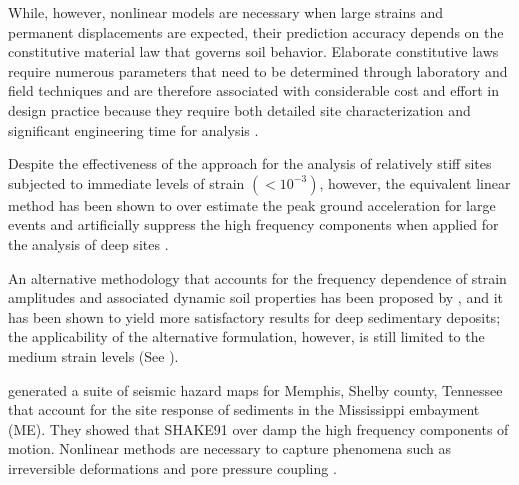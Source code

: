 While, however, nonlinear models are necessary when large strains and permanent displacements are expected, their prediction accuracy depends on the constitutive material law that governs soil behavior. Elaborate constitutive laws require numerous parameters that need to be determined through laboratory and field techniques and are therefore associated with considerable cost and effort in design practice because they require both detailed site characterization and significant engineering time for analysis \citep{Assimaki2008quantifying}.

Despite the effectiveness of the approach for the analysis of relatively stiff sites subjected to immediate levels of strain $(<10^{-3})$, however, the equivalent linear method has been shown to over estimate the peak ground acceleration for large events and artificially suppress the high frequency components when applied for the analysis of deep sites \citep{Assimaki2008quantifying}.

An alternative methodology that accounts for the frequency dependence of strain amplitudes and associated dynamic soil properties has been proposed by \citet{Assimaki2002equivalent}, and it has been shown to yield more satisfactory results for deep sedimentary deposits; the applicability of the alternative formulation, however, is still limited to the medium strain levels (See \citet{Assimaki2008quantifying}).

\citet{Cramer2004memphis} generated a suite of seismic hazard maps for Memphis, Shelby county, Tennessee that account for the site response of sediments in the Mississippi embayment (ME). They showed that SHAKE91 over damp the high frequency components of motion. Nonlinear methods are necessary to capture phenomena such as irreversible deformations and pore pressure coupling \citep{Assimaki2008quantifying}.




